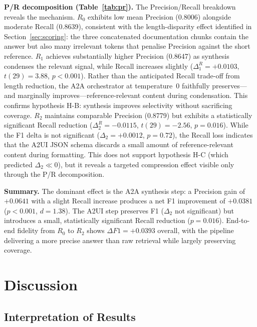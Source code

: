 \documentclass[10pt,journal,compsoc]{IEEEtran}
\begin{document}
\noindent\textbf{P/R decomposition (Table~\ref{tab:pr}).}
The Precision/Recall breakdown reveals the mechanism. $R_0$ exhibits low mean
Precision (0.8006) alongside moderate Recall (0.8639), consistent with the
length-disparity effect identified in Section~\ref{sec:scoring}: the three
concatenated documentation chunks contain the answer but also many irrelevant
tokens that penalise Precision against the short reference. $R_1$ achieves
substantially higher Precision (0.8647) as synthesis condenses the relevant
signal, while Recall increases slightly ($\Delta_1^R = +0.0103$, $t(29)=3.88$,
$p<0.001$). Rather than the anticipated Recall trade-off from length reduction,
the A2A orchestrator at temperature~0 faithfully preserves---and marginally
improves---reference-relevant content during condensation. This confirms
hypothesis H-B: synthesis improves selectivity without sacrificing coverage.
$R_2$ maintains comparable Precision (0.8779) but exhibits a statistically
significant Recall reduction ($\Delta_2^R = -0.0115$, $t(29)=-2.56$,
$p=0.016$). While the F1 delta is not significant ($\Delta_2 = +0.0012$,
$p=0.72$), the Recall loss indicates that the A2UI JSON schema discards a
small amount of reference-relevant content during formatting. This does not
support hypothesis H-C (which predicted $\Delta_2 \ll 0$), but it reveals a
targeted compression effect visible only through the P/R decomposition.

\noindent\textbf{Summary.}
The dominant effect is the A2A synthesis step: a Precision gain of $+0.0641$ with
a slight Recall increase produces a net F1 improvement of $+0.0381$ ($p<0.001$,
$d=1.38$). The A2UI step preserves F1 ($\Delta_2$ not significant) but
introduces a small, statistically significant Recall reduction ($p=0.016$).
End-to-end fidelity from $R_0$ to $R_2$ shows $\Delta F1 = +0.0393$ overall,
with the pipeline delivering a more precise answer than raw retrieval while
largely preserving coverage.


\section{Discussion}
\label{sec:discussion}

\subsection{Interpretation of Results}
\label{sec:interpretation}
\end{document}

